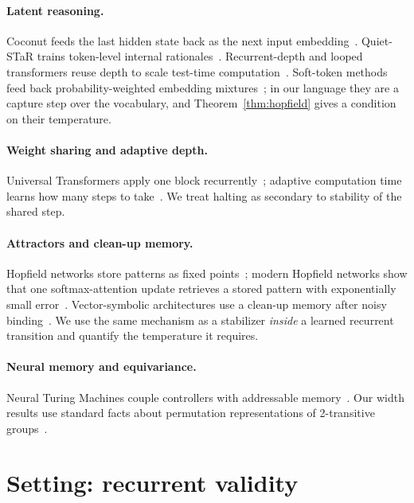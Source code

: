 \documentclass[11pt]{article}
\theoremstyle{definition}
\theoremstyle{remark}
\begin{document}
\paragraph{Latent reasoning.} Coconut feeds the last hidden state back as the next input
embedding~\cite{coconut}. Quiet-STaR trains token-level internal rationales~\cite{quietstar}.
Recurrent-depth and looped transformers reuse depth to scale test-time
computation~\cite{geiping,looped}. Soft-token methods feed back probability-weighted embedding
mixtures~\cite{softthinking}; in our language they are a capture step over the vocabulary, and
Theorem~\ref{thm:hopfield} gives a condition on their temperature.

\paragraph{Weight sharing and adaptive depth.} Universal Transformers apply one block
recurrently~\cite{ut}; adaptive computation time learns how many steps to take~\cite{act}. We
treat halting as secondary to stability of the shared step.

\paragraph{Attractors and clean-up memory.} Hopfield networks store patterns as fixed
points~\cite{hopfield}; modern Hopfield networks show that one softmax-attention update
retrieves a stored pattern with exponentially small error~\cite{ramsauer}. Vector-symbolic
architectures use a clean-up memory after noisy binding~\cite{plate,kanerva}. We use the same
mechanism as a stabilizer \emph{inside} a learned recurrent transition and quantify the
temperature it requires.

\paragraph{Neural memory and equivariance.} Neural Turing Machines couple controllers with
addressable memory~\cite{ntm}. Our width results use standard facts about permutation
representations of 2-transitive groups~\cite{serre}.

\section{Setting: recurrent validity}\label{sec:setting}
\end{document}
